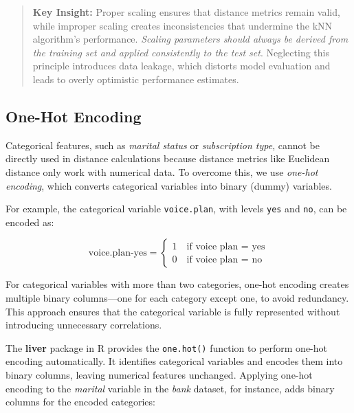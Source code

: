 \documentclass[
  11pt,
]{book}
\renewenvironment{quote}{\begin{quotation}}{\end{quotation}}
\theoremstyle{definition}
\theoremstyle{definition}
\theoremstyle{definition}
\theoremstyle{definition}
\theoremstyle{remark}
\begin{document}
\begin{quote}
\textbf{Key Insight:} Proper scaling ensures that distance metrics remain valid, while improper scaling creates inconsistencies that undermine the kNN algorithm's performance. \emph{Scaling parameters should always be derived from the training set and applied consistently to the test set}. Neglecting this principle introduces data leakage, which distorts model evaluation and leads to overly optimistic performance estimates.
\end{quote}

\subsection{One-Hot Encoding}\label{one-hot-encoding-1}

Categorical features, such as \emph{marital status} or \emph{subscription type}, cannot be directly used in distance calculations because distance metrics like Euclidean distance only work with numerical data. To overcome this, we use \emph{one-hot encoding}, which converts categorical variables into binary (dummy) variables.

For example, the categorical variable \texttt{voice.plan}, with levels \texttt{yes} and \texttt{no}, can be encoded as:

\[
\text{voice.plan-yes} = 
\begin{cases}
1 \quad \text{if voice plan = yes}  \\
0 \quad \text{if voice plan = no} 
\end{cases}
\]

For categorical variables with more than two categories, one-hot encoding creates multiple binary columns---one for each category except one, to avoid redundancy. This approach ensures that the categorical variable is fully represented without introducing unnecessary correlations.

The \textbf{liver} package in R provides the \texttt{one.hot()} function to perform one-hot encoding automatically. It identifies categorical variables and encodes them into binary columns, leaving numerical features unchanged. Applying one-hot encoding to the \emph{marital} variable in the \emph{bank} dataset, for instance, adds binary columns for the encoded categories:
\end{document}
